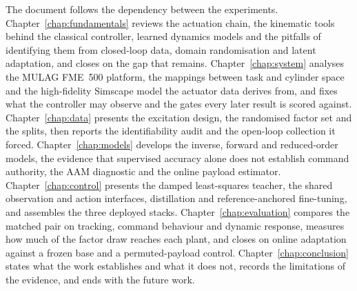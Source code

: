 The document follows the dependency between the experiments.
Chapter~\ref{chap:fundamentals} reviews the actuation chain, the kinematic
tools behind the classical controller, learned dynamics models and the pitfalls
of identifying them from closed-loop data, domain randomisation and latent
adaptation, and closes on the gap that remains.
Chapter~\ref{chap:system} analyses the MULAG FME~500 platform, the mappings
between task and cylinder space and the high-fidelity Simscape model the
actuator data derives from, and fixes what the controller may observe and the
gates every later result is scored against.
Chapter~\ref{chap:data} presents the excitation design, the randomised factor
set and the splits, then reports the identifiability audit and the open-loop
collection it forced.
Chapter~\ref{chap:models} develops the inverse, forward and reduced-order
models, the evidence that supervised accuracy alone does not establish command
authority, the AAM diagnostic and the online payload estimator.
Chapter~\ref{chap:control} presents the damped least-squares teacher, the
shared observation and action interfaces, distillation and reference-anchored
fine-tuning, and assembles the three deployed stacks.
Chapter~\ref{chap:evaluation} compares the matched pair on tracking, command
behaviour and dynamic response, measures how much of the factor draw reaches
each plant, and closes on online adaptation against a frozen base and a
permuted-payload control.
Chapter~\ref{chap:conclusion} states what the work establishes and what it does
not, records the limitations of the evidence, and ends with the future work.

